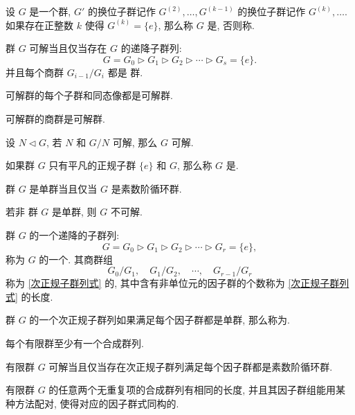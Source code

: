 \begin{definition}
	设 $G$ 是一个群, $G'$ 的换位子群记作 $G^{(2)},\ldots,G^{(k-1)}$ 的换位子群记作 $G^{(k)},\ldots$. 如果存在正整数 $k$ 使得 $G^{(k)}=\{e\}$, 那么称 $G$ 是, 否则称.
\end{definition}

\begin{theorem}
	群 $G$ 可解当且仅当存在 $G$ 的递降子群列: $$G=G_0\rhd G_1\rhd G_2\rhd\cdots\rhd G_s=\{e\}.$$ 并且每个商群 $G_{i-1}/G_i$ 都是 \Abel 群.
\end{theorem}

\begin{theorem}
	可解群的每个子群和同态像都是可解群.
\end{theorem}

\begin{corollary}
	可解群的商群是可解群.
\end{corollary}

\begin{theorem}
	设 $N\lhd G$, 若 $N$ 和 $G/N$ 可解, 那么 $G$ 可解.
\end{theorem}

\begin{definition}
	如果群 $G$ 只有平凡的正规子群 $\{e\}$ 和 $G$, 那么称 $G$ 是.
\end{definition}

\begin{theorem}\label{Abel单群}
	\Abel 群 $G$ 是单群当且仅当 $G$ 是素数阶循环群.
\end{theorem}

\begin{theorem}
	若非 \Abel 群 $G$ 是单群, 则 $G$ 不可解.
\end{theorem}

\begin{definition}
	群 $G$ 的一个递降的子群列: \begin{equation}\label{次正规子群列式}
		G=G_0\rhd G_1\rhd G_2\rhd\cdots\rhd G_r=\{e\},
	\end{equation}
	称为 $G$ 的一个. 其商群组 \begin{equation}
		G_0/G_1,\quad G_1/G_2,\quad\cdots,\quad G_{r-1}/G_r
	\end{equation}
	称为 \eqref{次正规子群列式} 的, 其中含有非单位元的因子群的个数称为 \eqref{次正规子群列式} 的长度.
\end{definition}

\begin{definition}
	群 $G$ 的一个次正规子群列如果满足每个因子群都是单群, 那么称为.
\end{definition}

\begin{proposition}
	每个有限群至少有一个合成群列.
\end{proposition}

\begin{corollary}
	有限群 $G$ 可解当且仅当存在次正规子群列满足每个因子群都是素数阶循环群.
\end{corollary}

\begin{theorem}
	有限群 $G$ 的任意两个无重复项的合成群列有相同的长度, 并且其因子群组能用某种方法配对, 使得对应的因子群式同构的.
\end{theorem}